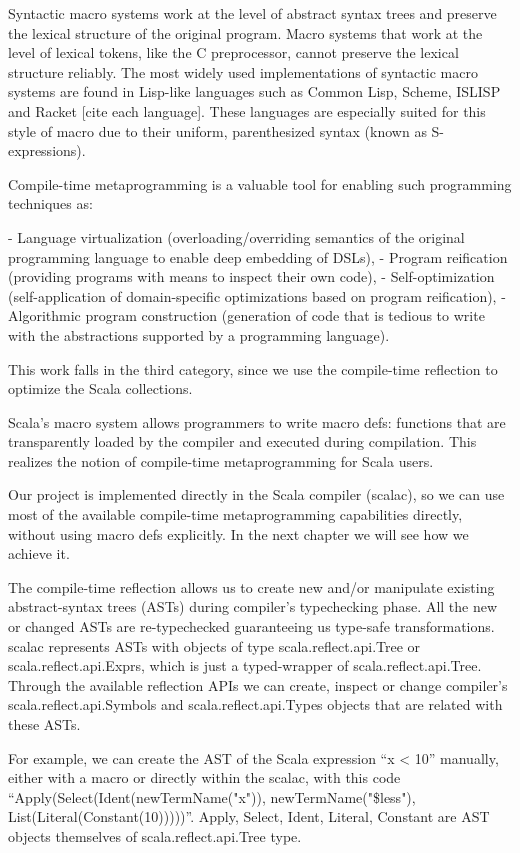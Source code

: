 Syntactic macro systems work at the level of abstract syntax trees and preserve
the lexical structure of the original program. Macro systems that work at the
level of lexical tokens, like the C preprocessor, cannot preserve the
lexical structure reliably. The most widely used implementations of syntactic
macro systems are found in Lisp-like languages such as Common Lisp, Scheme,
ISLISP and Racket [cite each language]. These languages are especially suited
for this style of macro due to their uniform, parenthesized syntax (known as
S-expressions).

Compile-time metaprogramming is a valuable tool for enabling such programming
techniques as:

- Language virtualization (overloading/overriding semantics of the original
programming language to enable deep embedding of DSLs),
- Program reification (providing programs with means to inspect their own code),
- Self-optimization (self-application of domain-specific optimizations based on
program reification),
- Algorithmic program construction (generation of code that is tedious to write
with the abstractions supported by a programming language).

This work falls in the third category, since we use the compile-time reflection
to optimize the Scala collections.

Scala's macro system allows programmers to write macro defs: functions that
are transparently loaded by the compiler and executed during compilation. This
realizes the notion of compile-time metaprogramming for Scala users.

Our project is implemented directly in the Scala compiler (scalac), so we can
use most of the available compile-time metaprogramming capabilities directly,
without using macro defs explicitly. In the next chapter we will see how we
achieve it.

The compile-time reflection allows us to create new and/or manipulate
existing abstract-syntax trees (ASTs) during compiler's typechecking phase.
All the new or changed ASTs are re-typechecked guaranteeing us type-safe
transformations. scalac represents ASTs with objects of type
scala.reflect.api.Tree or scala.reflect.api.Exprs, which is just a typed-wrapper
of scala.reflect.api.Tree. Through the available reflection APIs we can create,
inspect or change compiler's scala.reflect.api.Symbols and
scala.reflect.api.Types objects that are related with these ASTs.

For example, we can create the AST of the Scala expression ``x < 10'' manually,
either with a macro or directly within the scalac, with this code
``Apply(Select(Ident(newTermName("x")), newTermName("\$less"),
List(Literal(Constant(10)))))''. Apply, Select, Ident, Literal, Constant are AST
objects themselves of scala.reflect.api.Tree type.

